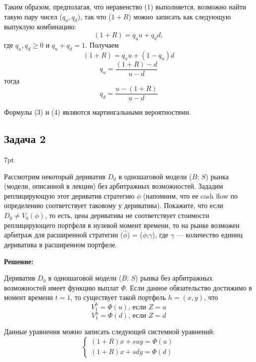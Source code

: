 \documentclass[a4paper,12pt]{article}
\newenvironment{formal}{%
	\def\FrameCommand{%
		\hspace{1pt}%
		{\color{black}\vrule width 1.5pt}%
		{\color{white}\vrule width 4pt}%
		\colorbox{white}%
	}%
	\MakeFramed{\advance\hsize-\width\FrameRestore}%
	\noindent\hspace{-4.55pt}%
	\begin{adjustwidth}{}{7pt}%
		\vspace{2pt}\vspace{2pt}%
	}
	{%
		\vspace{2pt}\end{adjustwidth}\endMakeFramed%
}
\begin{document}
Таким образом, предполагая, что неравенство (1) выполняется, возможно найти такую пару чисел ($q_u, q_d$), так что ($1+R$) можно записать как следующую выпуклую комбинацию:
\begin{equation}
	(1+R) = q_u u + q_d d,
\end{equation}
где $q_u, q_d \geq 0$ и $q_u + q_d = 1$. Получаем
\begin{equation*}
	(1+R) = q_u u + (1-q_u) d
\end{equation*}
\begin{equation}
	q_u = \frac{(1+R) - d}{u-d}
\end{equation}
тогда
\begin{equation}
	q_d = \frac{u - (1+R)}{u-d}
\end{equation}

Формулы (3) и (4) являются мартингальными вероятностями.

\subsection*{Задача 2}
\begin{formal}
Рассмотрим некоторый дериватив $D_0$ в одношаговой модели ($B$; $S$) рынка (модели, описанной в лекции) без арбитражных возможностей. Зададим реплицирующую этот дериватив стратегию $\phi$ (напомним, что ее cash flow по определению соответствует таковому у дериватива). Покажите, что если $D_0 \neq V_0(\phi)$, то есть, цена дериватива не соответствует стоимости реплицирующего портфеля в нулевой момент времени, то на рынке возможен арбитраж для расширенной стратегии ($\hat{\phi}$) = ($\phi$;$\gamma$), где $\gamma$ — количество единиц дериватива в расширенном портфеле.
\end{formal}
\textbf{\large Решение:}

Дериватив $D_0$ в одношаговой модели ($B$; $S$) рынка без арбитражных возможностей имеет функцию выплат $\Phi$. Если данное обязательство достижимо в момент времени $t=1$, то существует такой портфель $h = (x,y)$, что
\begin{equation*}
	V_1^h = \Phi(u) \text{, если $Z=u$}
\end{equation*}
\begin{equation*}
	V_1^h = \Phi(d) \text{, если $Z=d$}
\end{equation*}

Данные уравнения можно записать следующей системной уравнений:
\begin{equation*}
	\begin{cases}
		(1+R)x+suy = \Phi(u)\\
		(1+R)x+sdy = \Phi(d)
	\end{cases}
\end{equation*}
\end{document}
